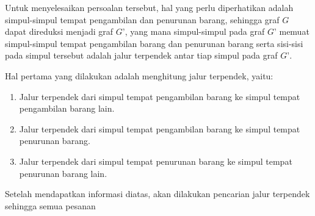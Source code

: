 Untuk menyelesaikan persoalan tersebut, hal yang perlu diperhatikan adalah simpul-simpul tempat pengambilan dan penurunan barang, sehingga graf $G$ 
dapat direduksi menjadi graf $G’$, yang mana simpul-simpul pada graf $G’$ memuat simpul-simpul tempat pengambilan barang dan penurunan barang serta 
sisi-sisi pada simpul tersebut adalah jalur terpendek antar tiap simpul pada graf $G’$.

Hal pertama yang dilakukan adalah menghitung jalur terpendek, yaitu:
\begin{enumerate}
    \item Jalur terpendek dari simpul tempat pengambilan barang ke simpul tempat pengambilan barang lain.
    \item Jalur terpendek dari simpul tempat pengambilan barang ke simpul tempat penurunan barang.
    \item Jalur terpendek dari simpul tempat penurunan barang ke simpul tempat penurunan barang lain.
\end{enumerate}

Setelah mendapatkan informasi diatas, akan dilakukan pencarian jalur terpendek sehingga semua pesanan 